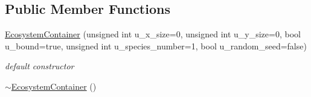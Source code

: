 \subsection*{Public Member Functions}
\begin{DoxyCompactItemize}
\item 
\hypertarget{classEcosystemContainer_a9eca43f1e0446d7f114e53ccacbe21af}{
\hyperlink{classEcosystemContainer_a9eca43f1e0446d7f114e53ccacbe21af}{EcosystemContainer} (unsigned int u\_\-x\_\-size=0, unsigned int u\_\-y\_\-size=0, bool u\_\-bound=true, unsigned int u\_\-species\_\-number=1, bool u\_\-random\_\-seed=false)}
\label{classEcosystemContainer_a9eca43f1e0446d7f114e53ccacbe21af}

\begin{DoxyCompactList}\small\item\em default constructor \end{DoxyCompactList}\item 
\hypertarget{classEcosystemContainer_aaf7bbc46ec920a24b51732a221bdc537}{
\hyperlink{classEcosystemContainer_aaf7bbc46ec920a24b51732a221bdc537}{$\sim$EcosystemContainer} ()}
\label{classEcosystemContainer_aaf7bbc46ec920a24b51732a221bdc537}


\end{DoxyCompactItemize}
